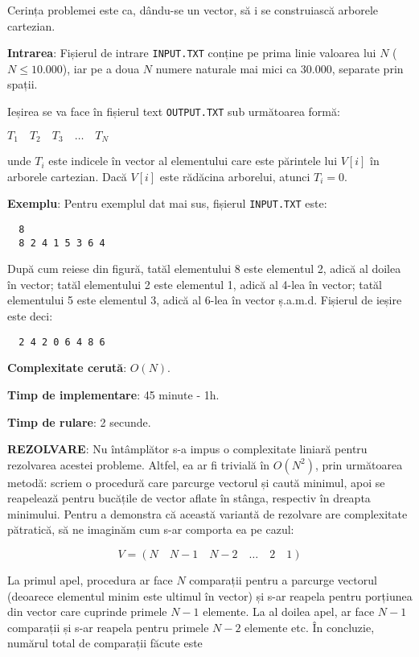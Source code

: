 Cerința problemei este ca, dându-se un vector, să i se construiască arborele
cartezian.

{\bf Intrarea}: Fișierul de intrare {\tt INPUT.TXT} conține pe prima linie
valoarea lui $N$ ($N \leq 10.000$), iar pe a doua $N$ numere naturale mai mici
ca 30.000, separate prin spații.

Ieșirea se va face în fișierul text {\tt OUTPUT.TXT} sub următoarea formă:

$T_1 \quad T_2 \quad T_3 \quad \dots \quad T_N$

unde $T_i$ este indicele în vector al elementului care este părintele lui
$V[i]$ în arborele cartezian. Dacă $V[i]$ este rădăcina arborelui, atunci $T_i
= 0$.

{\bf Exemplu}: Pentru exemplul dat mai sus, fișierul {\tt INPUT.TXT} este:

\begin{verbatim}
  8
  8 2 4 1 5 3 6 4
\end{verbatim}

După cum reiese din figură, tatăl elementului 8 este elementul 2, adică al
doilea în vector; tatăl elementului 2 este elementul 1, adică al 4-lea în
vector; tatăl elementului 5 este elementul 3, adică al 6-lea în vector
ș.a.m.d. Fișierul de ieșire este deci:

\begin{verbatim}
  2 4 2 0 6 4 8 6
\end{verbatim}

{\bf Complexitate cerută}: $O(N)$.

{\bf Timp de implementare}: 45 minute - 1h.

{\bf Timp de rulare}: 2 secunde.

{\bf REZOLVARE}: Nu întâmplător s-a impus o complexitate liniară pentru
rezolvarea acestei probleme. Altfel, ea ar fi trivială în $O(N^2)$, prin
următoarea metodă: scriem o procedură care parcurge vectorul și caută minimul,
apoi se reapelează pentru bucățile de vector aflate în stânga, respectiv în
dreapta minimului. Pentru a demonstra că această variantă de rezolvare are
complexitate pătratică, să ne imaginăm cum s-ar comporta ea pe cazul:

\begin{equation}
  V = (N \quad N-1 \quad N-2 \quad \dots \quad 2 \quad 1)
\end{equation}

La primul apel, procedura ar face $N$ comparații pentru a parcurge vectorul
(deoarece elementul minim este ultimul în vector) și s-ar reapela pentru
porțiunea din vector care cuprinde primele $N-1$ elemente. La al doilea apel,
ar face $N-1$ comparații și s-ar reapela pentru primele $N-2$ elemente etc. În
concluzie, numărul total de comparații făcute este

